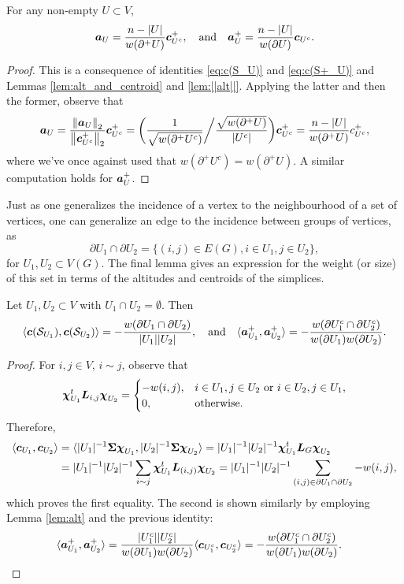 \begin{lemma}
\label{lem:alt}
For any non-empty $U\subset V$, 
\[\vb*{a}_U=\frac{n-|U|}{w(\partial^+ U)}\vb*{c}^+_{U^c},\quad \text{and}\quad \vb*{a}^+_U = \frac{n-|U|}{w(\partial U)} \vb*{c}_{U^c}.\]
\end{lemma}
\begin{proof}
This is a consequence of identities \eqref{eq:c(S_U)} and \eqref{eq:c(S+_U)} and Lemmas \ref{lem:alt_and_centroid} and \ref{lem:||alt||}. Applying the latter and then the former, observe that 
	\[\vb*{a}_U = \frac{\norm{\vb*{a}_U}_2}{\norm{\vb*{c}^+_{U^c}}_2}\vb*{c}^+_{U^c} =
\bigg(\frac{1}{\sqrt{w(\partial^+ U^c)}} \bigg/\frac{\sqrt{w(\partial^+U)}}{|U^c|} \bigg)\vb*{c}^+_{U^c} = \frac{n-|U|}{w(\partial^+U)}c^+_{U^c},\]
where we've once against used that $w(\partial^+ U^c )=w(\partial^+ U)$. A similar computation holds for $\vb*{a}_U^+$.  
\end{proof}

Just as one generalizes the incidence of a vertex to the neighbourhood of a set of vertices, one can generalize an edge to the incidence between groups of vertices, as
\[\partial U_1\cap \partial U_2 = \{(i,j)\in E(G), i\in U_1,j\in U_2\},\]
for $U_1,U_2\subset V(G)$. The final lemma gives an expression for the weight (or size) of this set in terms of the altitudes and centroids of the simplices. 


\begin{lemma}
	\label{lem:alt_centroid_dot_product}
Let $U_1,U_2\subset V$ with $U_1\cap U_2=\emptyset$. Then 
\begin{equation*}
    \langle \vb*{c}(\mathcal{S}_{U_1}),\vb*{c}(\mathcal{S}_{U_2})\rangle = - \frac{w(\partial U_1\cap \partial U_2)}{|U_1||U_2|},\quad\text{and}\quad \langle \vb*{a}^+_{U_1},\vb*{a}^+_{U_2}\rangle = -\frac{w(\partial U_1^c\cap \partial U_2^c)}{w(\partial U_1)w(\partial U_2)}.
\end{equation*}
\end{lemma}
\begin{proof}
For $i,j\in V$, $i\sim j$, observe that 
\[\boldsymbol{\chi}_{U_1}^t \vb*{L}_{i,j}\boldsymbol{\chi}_{U_2}=
\begin{cases}
-w(i,j),& i\in U_1,j\in U_2\text{ or }i\in U_2,j\in U_1,\\
0,&\text{otherwise.}
\end{cases}\]
Therefore, 
\begin{align*}
    \langle \vb*{c}_{U_1},\vb*{c}_{U_2}\rangle &= \langle |U_1|^{-1}\boldsymbol{\Sigma}\boldsymbol{\chi}_{U_1},|U_2|^{-1}\boldsymbol{\Sigma}\boldsymbol{\chi}_{U_2}\rangle = |U_1|^{-1}|U_2|^{-1} \boldsymbol{\chi}_{U_1}^t \vb*{L}_G\boldsymbol{\chi}_{U_2} \\
    &= |U_1|^{-1}|U_2|^{-1}\sum_{i\sim j} \boldsymbol{\chi}_{U_1}^t \vb*{L}_{(i,j)}\boldsymbol{\chi}_{U_2} = |U_1|^{-1}|U_2|^{-1}\sum_{(i,j)\in \partial U_1\cap \partial U_2} -w(i,j),
\end{align*}
which proves the first equality. The second is shown similarly by employing Lemma \ref{lem:alt} and the previous identity:
\begin{align*}
    \langle \vb*{a}^+_{U_1},\vb*{a}^+_{U_2}\rangle &= \frac{|U_1^c||U_2^c|}{w(\partial U_1) w(\partial U_2)}\langle \vb*{c}_{U_1^c},\vb*{c}_{U_2^c}\rangle
    =-\frac{w(\partial U_1^c\cap \partial U_2^c)}{w(\partial U_1)w(\partial U_2)}.\qedhere
\end{align*}
\end{proof}

